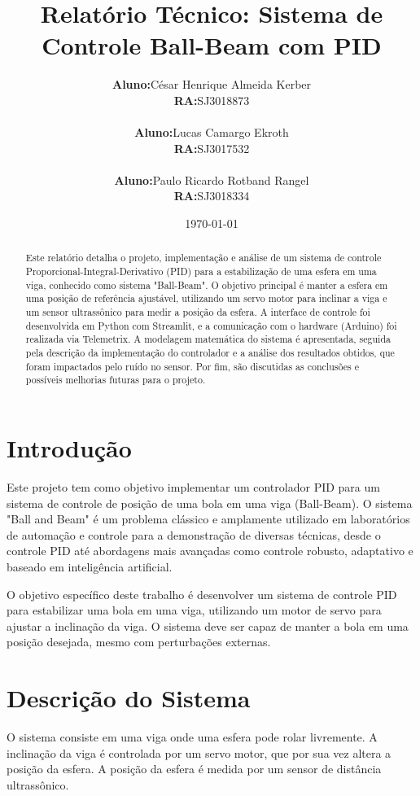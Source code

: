 \documentclass[a4paper, 11pt]{article}
\title{Relatório Técnico: Sistema de Controle Ball-Beam com PID}
\author{
\begin{tabular}{ll}
\textbf{Aluno:} & César Henrique Almeida Kerber \\
\textbf{RA:} & SJ3018873 \\
\\
\textbf{Aluno:} & Lucas Camargo Ekroth \\
\textbf{RA:} & SJ3017532 \\
\\
\textbf{Aluno:} & Paulo Ricardo Rotband Rangel \\
\textbf{RA:} & SJ3018334 \\
\end{tabular}
}
\date{\today}
\begin{document}
\maketitle

\begin{abstract}
Este relatório detalha o projeto, implementação e análise de um sistema de controle Proporcional-Integral-Derivativo (PID) para a estabilização de uma esfera em uma viga, conhecido como sistema "Ball-Beam". O objetivo principal é manter a esfera em uma posição de referência ajustável, utilizando um servo motor para inclinar a viga e um sensor ultrassônico para medir a posição da esfera. A interface de controle foi desenvolvida em Python com Streamlit, e a comunicação com o hardware (Arduino) foi realizada via Telemetrix. A modelagem matemática do sistema é apresentada, seguida pela descrição da implementação do controlador e a análise dos resultados obtidos, que foram impactados pelo ruído no sensor. Por fim, são discutidas as conclusões e possíveis melhorias futuras para o projeto.
\end{abstract}

\tableofcontents
\newpage

\section{Introdução}
Este projeto tem como objetivo implementar um controlador PID para um sistema de controle de posição de uma bola em uma viga (Ball-Beam). O sistema "Ball and Beam" é um problema clássico e amplamente utilizado em laboratórios de automação e controle para a demonstração de diversas técnicas, desde o controle PID até abordagens mais avançadas como controle robusto, adaptativo e baseado em inteligência artificial.

O objetivo específico deste trabalho é desenvolver um sistema de controle PID para estabilizar uma bola em uma viga, utilizando um motor de servo para ajustar a inclinação da viga. O sistema deve ser capaz de manter a bola em uma posição desejada, mesmo com perturbações externas.

\section{Descrição do Sistema}
O sistema consiste em uma viga onde uma esfera pode rolar livremente. A inclinação da viga é controlada por um servo motor, que por sua vez altera a posição da esfera. A posição da esfera é medida por um sensor de distância ultrassônico.
\end{document}
